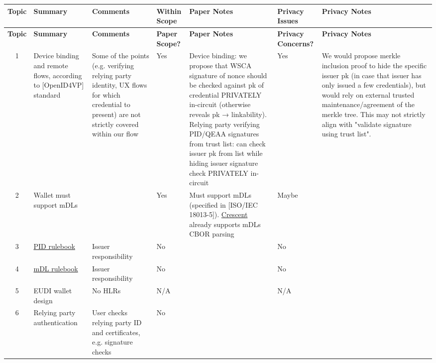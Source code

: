 \footnotesize
\begin{longtable}{|c|p{}|p{}|p{}|p{}|p{}|p{}|}
\hline
\textbf{Topic} & \textbf{Summary} & \textbf{Comments} & \textbf{Within Scope} & \textbf{Paper Notes} & \textbf{Privacy Issues} & \textbf{Privacy Notes} \\
\hline
\endfirsthead
\hline
\textbf{Topic} & \textbf{Summary} & \textbf{Comments} & \textbf{Paper Scope?} & \textbf{Paper Notes} & \textbf{Privacy Concerns?} & \textbf{Privacy Notes} \\
\hline
\endhead

1 & Device binding and remote flows, according to [OpenID4VP] standard & Some of the points (e.g. verifying relying party identity, UX flows for which credential to present) are not strictly covered within our flow & Yes & Device binding: we propose that WSCA signature of nonce should be checked against pk of credential PRIVATELY in-circuit (otherwise reveals pk → linkability). Relying party verifying PID/QEAA signatures from trust list: can check issuer pk from list while hiding issuer signature check PRIVATELY in-circuit & Yes & We would propose merkle inclusion proof to hide the specific issuer pk (in case that issuer has only issued a few credentials), but would rely on external trusted maintenance/agreement of the merkle tree. This may not strictly align with "validate signature using trust list". \\
\hline

2 & Wallet must support mDLs & & Yes & Must support mDLs (specified in [ISO/IEC 18013-5]). \href{https://github.com/microsoft/crescent-credentials}{Crescent} already supports mDLs CBOR parsing & Maybe & \\
\hline

3 & \href{https://eu-
digital-identity-
wallet.github.io/eudi-
doc-architecture-
and-reference-
framework/1.4.0/annexes/annex-
3/annex-3.01-pid-
rulebook/}{PID rulebook} & Issuer responsibility & No & & No & \\
\hline

4 & \href{https://eu-digital-identity-wallet.github.io/eudi-doc-architecture-and-reference-framework/latest/annexes/annex-3/annex-3.02-mDL-rulebook/}{mDL rulebook} & Issuer responsibility & No & & No & \\
\hline

5 & EUDI wallet design & No HLRs & N/A & & N/A & \\
\hline

6 & Relying party authentication & User checks relying party ID and certificates, e.g. signature checks & No & & & \\
\hline


\end{longtable}
